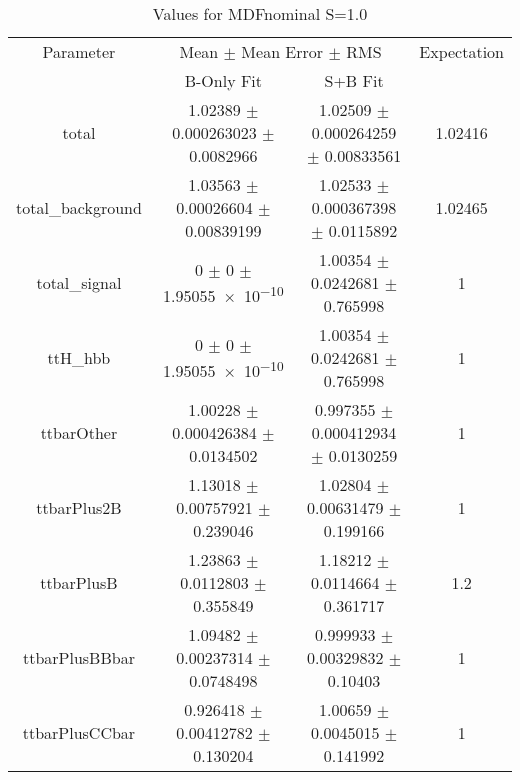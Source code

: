\begin{table}
\centering
\caption{Values for MDFnominal S=1.0}
\begin{tabular}{cccc}
\toprule
Parameter & \multicolumn{2}{c}{Mean $\pm$ Mean Error $\pm$ RMS} & Expectation\\
 & B-Only Fit & S+B Fit & \\
\midrule
total & \num{1.02389} $\pm$ \num{0.000263023} $\pm$ \num{0.0082966} & \num{1.02509} $\pm$ \num{0.000264259} $\pm$ \num{0.00833561} & \num{1.02416}\\
total\_background & \num{1.03563} $\pm$ \num{0.00026604} $\pm$ \num{0.00839199} & \num{1.02533} $\pm$ \num{0.000367398} $\pm$ \num{0.0115892} & \num{1.02465}\\
total\_signal & \num{0} $\pm$ \num{0} $\pm$ \num{1.95055e-10} & \num{1.00354} $\pm$ \num{0.0242681} $\pm$ \num{0.765998} & \num{1}\\
ttH\_hbb & \num{0} $\pm$ \num{0} $\pm$ \num{1.95055e-10} & \num{1.00354} $\pm$ \num{0.0242681} $\pm$ \num{0.765998} & \num{1}\\
ttbarOther & \num{1.00228} $\pm$ \num{0.000426384} $\pm$ \num{0.0134502} & \num{0.997355} $\pm$ \num{0.000412934} $\pm$ \num{0.0130259} & \num{1}\\
ttbarPlus2B & \num{1.13018} $\pm$ \num{0.00757921} $\pm$ \num{0.239046} & \num{1.02804} $\pm$ \num{0.00631479} $\pm$ \num{0.199166} & \num{1}\\
ttbarPlusB & \num{1.23863} $\pm$ \num{0.0112803} $\pm$ \num{0.355849} & \num{1.18212} $\pm$ \num{0.0114664} $\pm$ \num{0.361717} & \num{1.2}\\
ttbarPlusBBbar & \num{1.09482} $\pm$ \num{0.00237314} $\pm$ \num{0.0748498} & \num{0.999933} $\pm$ \num{0.00329832} $\pm$ \num{0.10403} & \num{1}\\
ttbarPlusCCbar & \num{0.926418} $\pm$ \num{0.00412782} $\pm$ \num{0.130204} & \num{1.00659} $\pm$ \num{0.0045015} $\pm$ \num{0.141992} & \num{1}\\
\bottomrule
\end{tabular}
\end{table}